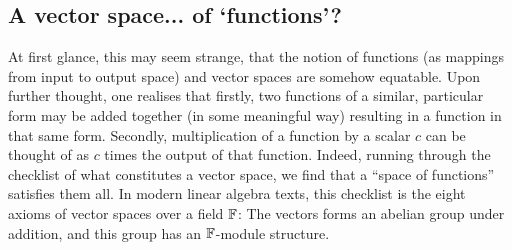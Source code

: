 \subsection{A vector space... of `functions'?}

At first glance, this may seem strange, that the notion of functions (as mappings from input to output space) and vector spaces are somehow equatable.
Upon further thought, one realises that firstly, two functions of a similar, particular form may be added together (in some meaningful way) resulting in a function in that same form. 
Secondly, multiplication of a function by a scalar $c$ can be thought of as $c$ times the output of that function.
Indeed, running through the checklist of what constitutes a vector space, we find that a ``space of functions'' satisfies them all.
In modern linear algebra texts, this checklist is the eight axioms of vector spaces over a field $\mathbb{F}$: The vectors forms an abelian group under addition, and this group has an $\mathbb{F}$-module structure.



%
